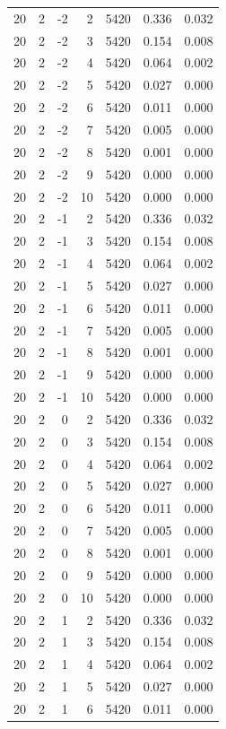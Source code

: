 \begin{table}
\begin{tabular}{rrrrrrr}
20 & 2 & -2 & 2 & 5420 & 0.336 & 0.032 \\
20 & 2 & -2 & 3 & 5420 & 0.154 & 0.008 \\
20 & 2 & -2 & 4 & 5420 & 0.064 & 0.002 \\
20 & 2 & -2 & 5 & 5420 & 0.027 & 0.000 \\
20 & 2 & -2 & 6 & 5420 & 0.011 & 0.000 \\
20 & 2 & -2 & 7 & 5420 & 0.005 & 0.000 \\
20 & 2 & -2 & 8 & 5420 & 0.001 & 0.000 \\
20 & 2 & -2 & 9 & 5420 & 0.000 & 0.000 \\
20 & 2 & -2 & 10 & 5420 & 0.000 & 0.000 \\
20 & 2 & -1 & 2 & 5420 & 0.336 & 0.032 \\
20 & 2 & -1 & 3 & 5420 & 0.154 & 0.008 \\
20 & 2 & -1 & 4 & 5420 & 0.064 & 0.002 \\
20 & 2 & -1 & 5 & 5420 & 0.027 & 0.000 \\
20 & 2 & -1 & 6 & 5420 & 0.011 & 0.000 \\
20 & 2 & -1 & 7 & 5420 & 0.005 & 0.000 \\
20 & 2 & -1 & 8 & 5420 & 0.001 & 0.000 \\
20 & 2 & -1 & 9 & 5420 & 0.000 & 0.000 \\
20 & 2 & -1 & 10 & 5420 & 0.000 & 0.000 \\
20 & 2 & 0 & 2 & 5420 & 0.336 & 0.032 \\
20 & 2 & 0 & 3 & 5420 & 0.154 & 0.008 \\
20 & 2 & 0 & 4 & 5420 & 0.064 & 0.002 \\
20 & 2 & 0 & 5 & 5420 & 0.027 & 0.000 \\
20 & 2 & 0 & 6 & 5420 & 0.011 & 0.000 \\
20 & 2 & 0 & 7 & 5420 & 0.005 & 0.000 \\
20 & 2 & 0 & 8 & 5420 & 0.001 & 0.000 \\
20 & 2 & 0 & 9 & 5420 & 0.000 & 0.000 \\
20 & 2 & 0 & 10 & 5420 & 0.000 & 0.000 \\
20 & 2 & 1 & 2 & 5420 & 0.336 & 0.032 \\
20 & 2 & 1 & 3 & 5420 & 0.154 & 0.008 \\
20 & 2 & 1 & 4 & 5420 & 0.064 & 0.002 \\
20 & 2 & 1 & 5 & 5420 & 0.027 & 0.000 \\
20 & 2 & 1 & 6 & 5420 & 0.011 & 0.000 \\

\end{tabular}
\end{table}
